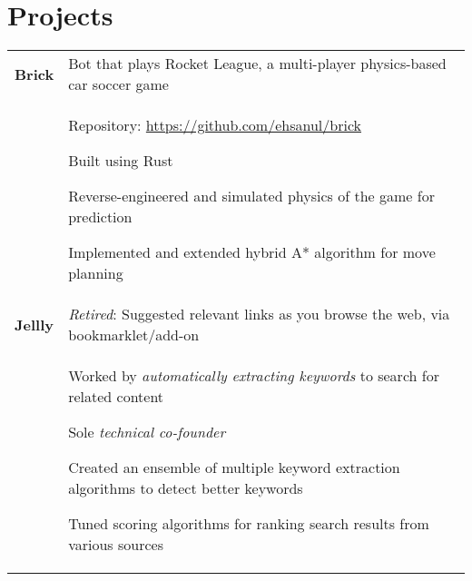 \documentclass[a4paper,10pt]{article}
\newenvironment{packed-list}{
  \vspace{2pt}
  \begin{itemize}[itemsep=1pt,partopsep=0pt,leftmargin=1.5em]
    \setlength{\parskip}{0pt}
    \setlength{\partopsep}{9pt}
    \setlength{\parsep}{0pt}
    \setlength{\topsep}{0pt}
} {\end{itemize}}
\begin{document}
\section{Projects}
\begin{tabular}{p{}p{}}
  \hfill \textbf{Brick}
    & Bot that plays Rocket League, a multi-player physics-based car soccer game\\
    & Repository: \href{https://github.com/ehsanul/brick}{https://github.com/ehsanul/brick} 
    \begin{packed-list}
      \item{ Built using Rust }
      \item{ Reverse-engineered and simulated physics of the game for prediction }
      \item{ Implemented and extended hybrid A* algorithm for move planning }
    \end{packed-list}
    \vspace{-5pt}
    \\
  \hfill \textbf{Jellly}
    & {\em Retired}: Suggested relevant links as you browse the web, via bookmarklet/add-on\\
    & Worked by \emph{automatically extracting keywords} to search for related content
    \begin{packed-list}
      \item{ Sole \emph{technical co-founder} }
      \item{ Created an ensemble of multiple keyword extraction algorithms to detect better keywords}
      \item{ Tuned scoring algorithms for ranking search results from various sources }
    \end{packed-list}
    \vspace{-5pt}
    \\
\end{tabular}
\vspace{-25pt}
\end{document}
